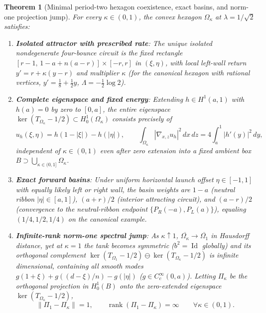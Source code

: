 \documentclass[11pt,reqno]{amsart}
\newtheorem{theorem}{Theorem}[section]
\theoremstyle{definition}
\theoremstyle{remark}
\DeclareMathOperator{\rank}{rank}
\DeclareMathOperator{\Id}{Id}
\begin{document}
\begin{theorem}[Minimal period-two hexagon coexistence, exact basins, and norm-one projection jump]\label{thm:hexagon-jump}
For every $\kappa \in (0,1)$, the convex hexagon $\Omega_\kappa$ at $\lambda = 1/\sqrt{2}$ satisfies:
\begin{enumerate}
  \item \textbf{Isolated attractor with prescribed rate}: The unique isolated nondegenerate four-bounce circuit is the fixed rectangle $[r-1,\, 1-a+n(a-r)] \times [-r, r]$ in $(\xi,\eta)$, with local left-wall return $y' = r + \kappa(y - r)$ and multiplier $\kappa$ (for the canonical hexagon with rational vertices, $y' = \frac{1}{8} + \frac{1}{2}y$, $\Lambda = -\frac{1}{2}\log 2$).
  \item \textbf{Complete eigenspace and fixed energy}: Extending $h \in H^1(a, 1)$ with $h(a) = 0$ by zero to $[0,a]$, the entire eigenspace $\ker(T_{\Omega_\kappa} - 1/2) \subset H_0^1(\Omega_\kappa)$ consists precisely of
  \begin{equation}\label{eq:exact-eigenspace}
    u_h(\xi,\eta) = h(1 - |\xi|) - h(|\eta|), \qquad \int_{\Omega_\kappa} |\nabla_{x,z} u_h|^2 \, dx\,dz = 4 \int_a^1 |h'(y)|^2 \, dy,
  \end{equation}
  independent of $\kappa \in (0,1)$ even after zero extension into a fixed ambient box $B \supset \bigcup_{\kappa \in (0,1]} \Omega_\kappa$.
  \item \textbf{Exact forward basins}: Under uniform horizontal launch offset $\eta \in [-1,1]$ with equally likely left or right wall, the basin weights are $1-a$ (neutral ribbon $|\eta| \in [a,1]$), $(a+r)/2$ (interior attracting circuit), and $(a-r)/2$ (convergence to the neutral-ribbon endpoint $\{P_R(-a), P_L(a)\}$), equaling $(1/4, 1/2, 1/4)$ on the canonical example.
  \item \textbf{Infinite-rank norm-one spectral jump}: As $\kappa \uparrow 1$, $\overline{\Omega_\kappa} \to \overline{\Omega_1}$ in Hausdorff distance, yet at $\kappa = 1$ the tank becomes symmetric ($b^2 = \Id$ globally) and its orthogonal complement $\ker(T_{\Omega_1} - 1/2) \ominus \ker(T_{\Omega_\kappa} - 1/2)$ is infinite dimensional, containing all smooth modes $g(1+\xi) + g((d-\xi)/n) - g(|\eta|)$ ($g \in C_c^\infty(0,a)$). Letting $\Pi_\kappa$ be the orthogonal projection in $H_0^1(B)$ onto the zero-extended eigenspace $\ker(T_{\Omega_\kappa} - 1/2)$,
  \begin{equation}\label{eq:proj-jump}
    \|\Pi_1 - \Pi_\kappa\| = 1, \qquad \rank(\Pi_1 - \Pi_\kappa) = \infty \qquad \forall \kappa \in (0,1).
  \end{equation}
\end{enumerate}
\end{theorem}
\end{document}
